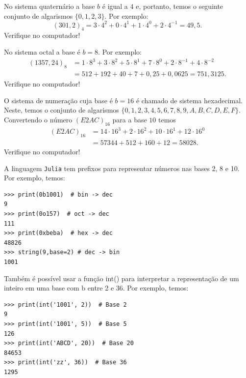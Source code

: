 \begin{ex}
No sistema quaternário a base $b$ é igual a $4$ e, portanto, temos o seguinte conjunto de algarismos $\{0, 1, 2, 3\}$. Por exemplo:
  \begin{equation}
    (301,2)_{4}=3\cdot 4^2+0\cdot 4^1+1\cdot 4^0+2\cdot 4^{-1}=49,5.
  \end{equation}
Verifique no computador!
\end{ex}

\begin{ex}
No sistema octal a base é $b=8$. Por exemplo:
\begin{equation}
  \begin{split}
    (1357,24)_{8}&= 1\cdot 8^3+3\cdot 8^2+5\cdot 8^1+7\cdot 8^{0}+2\cdot 8^{-1}+4\cdot 8^{-2}\\
    &= 512+192+40+7+0,25+0,0625=751,3125.
  \end{split}
\end{equation}
Verifique no computador!
\end{ex}

\begin{ex} O sistema de numeração cuja base é $b=16$ é chamado de sistema hexadecimal. Neste, temos o conjunto de algarismos $\{0, 1, 2, 3, 4, 5, 6, 7, 8, 9, A, B, C, D, E, F\}$. Convertendo o número $(E2AC)_{16}$ para a base $10$ temos
\begin{equation}
  \begin{split}
  (E2AC)_{16} &= 14\cdot 16^3+2\cdot 16^2+10\cdot 16^1+12\cdot 16^{0}\\
  &=57344+512+160+12=58028.
  \end{split}
\end{equation}
Verifique no computador!
\end{ex}


\begin{obs}
  A linguagem \verb+Julia+ tem prefixos para representar números nas bases 2, 8 e 10. Por exemplo, temos:

  \begin{lstlisting}
>>> print(0b1001)  # bin -> dec
9
>>> print(0o157)  # oct -> dec
111
>>> print(0xbeba)  # hex -> dec
48826
>>> string(9,base=2) # dec -> bin
1001
  \end{lstlisting}

Também é possível usar a função int() para interpretar a representação de um inteiro em uma base com b entre 2 e 36. Por exemplo, temos:

\begin{lstlisting}
>>> print(int('1001', 2))  # Base 2
9
>>> print(int('1001', 5))  # Base 5
126
>>> print(int('ABCD', 20))  # Base 20
84653
>>> print(int('zz', 36))  # Base 36
1295
\end{lstlisting}
\end{obs}


